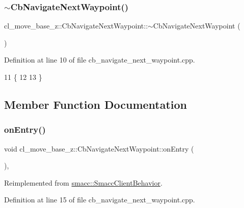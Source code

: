 \subsubsection{\texorpdfstring{$\sim$\+Cb\+Navigate\+Next\+Waypoint()}{~CbNavigateNextWaypoint()}}
{\footnotesize\ttfamily cl\+\_\+move\+\_\+base\+\_\+z\+::\+Cb\+Navigate\+Next\+Waypoint\+::$\sim$\+Cb\+Navigate\+Next\+Waypoint (\begin{DoxyParamCaption}{ }\end{DoxyParamCaption})\hspace{0.3cm}{\ttfamily [virtual]}}



Definition at line 10 of file cb\+\_\+navigate\+\_\+next\+\_\+waypoint.\+cpp.


\begin{DoxyCode}
11     \{
12 
13     \}
\end{DoxyCode}


\subsection{Member Function Documentation}
\mbox{\label{classcl__move__base__z_1_1CbNavigateNextWaypoint_a04913ef24344363669c1916b5df28493}} 
\subsubsection{\texorpdfstring{on\+Entry()}{onEntry()}}
{\footnotesize\ttfamily void cl\+\_\+move\+\_\+base\+\_\+z\+::\+Cb\+Navigate\+Next\+Waypoint\+::on\+Entry (\begin{DoxyParamCaption}{ }\end{DoxyParamCaption})\hspace{0.3cm}{\ttfamily [override]}, {\ttfamily [virtual]}}



Reimplemented from \hyperlink{classsmacc_1_1SmaccClientBehavior_a7962382f93987c720ad432fef55b123f}{smacc\+::\+Smacc\+Client\+Behavior}.



Definition at line 15 of file cb\+\_\+navigate\+\_\+next\+\_\+waypoint.\+cpp.



